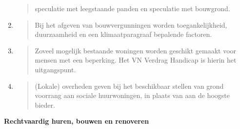 \begin{enumerate}
\begin{quote}
  speculatie met leegstaande panden en speculatie met bouwgrond.
  \end{quote}
\item
  \begin{quote}
  Bij het afgeven van bouwvergunningen worden toegankelijkheid,
  duurzaamheid en een klimaatparagraaf bepalende factoren.
  \end{quote}
\item
  \begin{quote}
  Zoveel mogelijk bestaande woningen worden geschikt gemaakt voor mensen
  met een beperking. Het VN Verdrag Handicap is hierin het uitgangspunt.
  \end{quote}
\item
  \begin{quote}
  (Lokale) overheden geven bij het beschikbaar stellen van grond
  voorrang aan sociale huurwoningen, in plaats van aan de hoogste
  bieder.
  \end{quote}
\end{enumerate}

\textbf{Rechtvaardig huren, bouwen en renoveren}

